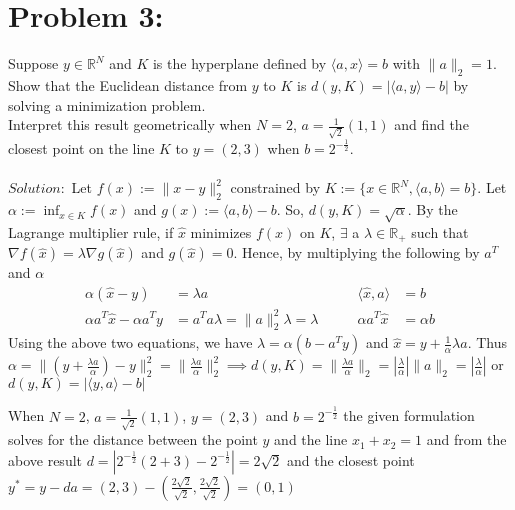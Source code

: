 \documentclass[12pt]{report}
\begin{document}
\section*{Problem 3:}
Suppose $y \in \mathbb{R}^N$ and $K$ is the hyperplane defined by
$\langle a,x \rangle = b$ with $\|a\|_2 = 1$. Show that the Euclidean distance from
$y$ to $K$ is $d(y,K) = |\langle a,y \rangle - b|$ by solving a minimization
problem.\\
Interpret this result geometrically when $N=2$, $a=\frac{1}{\sqrt{2}}(1,1)$ and find
the closest point on the line $K$ to $y = (2, 3)$ when $b = 2^{-\frac{1}{2}}$. \\
\\
$Solution:$ Let $f(x):=\|x-y\|_2^2$ constrained by
$K:=\{x\in\mathbb{R}^N,\langle a,b \rangle = b\}$. Let $\alpha:= \inf_{x\in K} f(x) $
and $g(x):=\langle a,b \rangle -b$. So, $d(y,K)=\sqrt{\alpha}$. By the Lagrange
multiplier rule, if $\hat{x}$ minimizes $f(x)$ on $K$, $\exists$ a $\lambda \in 
\mathbb{R}_+$ such that $\nabla f(\hat{x})=\lambda \nabla g(\hat{x})$ and 
$ g(\hat{x})=0$. Hence, by multiplying the following by $a^T$ and $\alpha$
\begin{align*}
\alpha(\hat{x}-y) &=\lambda a \quad & \quad \langle \hat{x},a\rangle&=b\\
\alpha a^T\hat{x}-\alpha a^T y &= a^Ta \lambda =  \|a\|_2^2 \lambda = \lambda \quad &
\quad \alpha a^T \hat{x} &= \alpha b
\end{align*}
Using the above two equations, we have $\lambda = \alpha(b-a^Ty)$ and 
$\hat{x} = y+\frac{1}{\alpha} \lambda a$. Thus
$\alpha = \|(y+\frac{\lambda a}{\alpha})-y\|_2^2 = \|\frac{\lambda a}{\alpha}\|^2_2
\implies d(y,K)= \|\frac{\lambda a}{\alpha}\|_2=|\frac{\lambda}{\alpha}|\|a\|_2 
= |\frac{\lambda}{\alpha}|$ or $d(y,K)= |\langle y,a \rangle-b|$

When  $N=2$, $a=\frac{1}{\sqrt{2}}(1,1)$, $y = (2, 3)$ and $b = 2^{-\frac{1}{2}}$ the
given formulation solves for the distance between the point $y$ and the line
$x_1+x_2=1$ and from the above result 
$d=|2^{-\frac{1}{2}}(2+3)-2^{-\frac{1}{2}}|=2\sqrt 2$ and the closest point 
$y^* = y-da = (2,3)-(\frac{2\sqrt 2}{\sqrt 2},\frac{2\sqrt 2}{\sqrt 2})=(0,1)$
\end{document}
